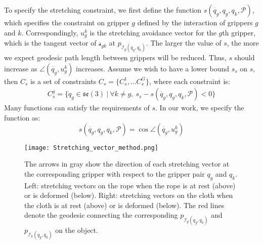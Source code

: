 To specify the stretching constraint, we first define the function $s(\dot{q_g}, q_g, q_k, \mathcal{P})$, which specifies the constraint on gripper $g$ defined by the interaction of grippers $g$ and $k$.
Correspondingly, $u_g^k$ is the stretching avoidance vector for the $g$th gripper, which is the tangent vector of $\mathcal{s}_{gk}$ at $p_{\mathcal{I}_g(q_g,q_k)}$. The larger the value of $s$, the more we expect geodesic path length between grippers will be reduced. 
Thus, $s$ should increase as $\angle (\dot{q_g}, u_g^k)$ increases. Assume we wish to have a lower bound $s_s$ on $s$, then $C_s$ is a set of constraints $C_s = \{C_s^1, ... C_s^G\}$, where each constraint is:
\begin{equation}
\begin{split}
C_s^g =\{ \dot{q}_g\in \mathfrak{se}(3)\: |\: \forall k\neq g, \ s_s -s(\dot{q_g}, q_g, q_k, \mathcal{P}) < 0  \}
\end{split}
\label{Eq: Stretching_avoidance_Method}
\end{equation}
Many functions can satisfy the requirements of $s$. In our work, we specify the function as:
\begin{equation}
s(\dot{q_g}, q_g, q_k, \mathcal{P}) = \cos \angle (\dot{q_g}, u_g^k )
\label{Eq: Stretching_avoidance_Method_This_Paper}
\end{equation}


\begin{figure}[t]
  \centering
  \texttt{[image: Stretching\_vector\_method.png]}
  \caption{The arrows in gray show the direction of each stretching vector at the corresponding gripper with respect to the gripper pair $q_g$ and $q_k$. Left: stretching vectors on the rope when the rope is at rest (above) or is deformed (below). Right: stretching vectors on the cloth when the cloth is at rest (above) or is deformed (below). The red lines denote the geodesic connecting the corresponding $p_{\mathcal{I}_g(q_g,q_k)}$ and $p_{\mathcal{I}_k(q_g,q_k)}$ on the object.}
  \label{Fig: stretching_avoidance_vector_method}
\end{figure}


